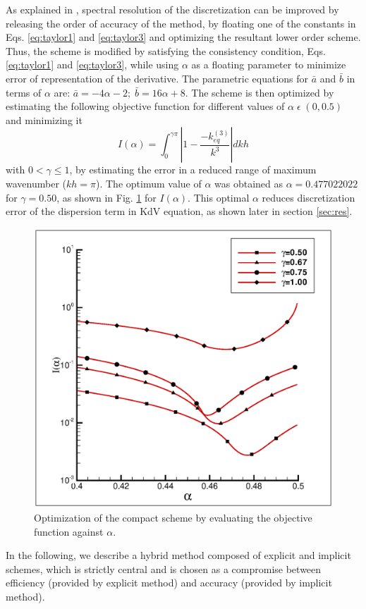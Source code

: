 \documentclass{svjour3}                    %
\begin{document}
 As explained in \cite{Sengupta2013a,Sengupta2006b}, spectral resolution of the discretization
can be improved by releasing the order of accuracy of the method, by floating one of the constants in Eqs.  \eqref{eq:taylor1} and \eqref{eq:taylor3}
and optimizing the resultant lower order scheme. Thus, the scheme is modified by satisfying the consistency condition, Eqs. \eqref{eq:taylor1} and 
\eqref{eq:taylor3}, while using $\alpha$ as a floating parameter to minimize error of representation of the derivative. The parametric equations for 
$\bar{a}$ and $\bar{b}$ in terms of $\alpha$ are: $ \bar{a}= -4\alpha-2;\; \bar{b}=16\alpha +8$. The scheme is then optimized by estimating the following objective function for different values of $\alpha\; \epsilon\; (0,0.5)$ and minimizing it
\begin{equation}
\label{obj}
I(\alpha) = \int_0^{\gamma\pi} \left| 1 - \frac{-k_{eq}^{(3)}}{k^3} \right| dkh
\end{equation}
with $0<\gamma\leq 1$, by estimating the error in a reduced range of maximum wavenumber ($kh = \pi$). The optimum value of $\alpha$ was obtained as 
$\alpha=0.477022022$ for $\gamma = 0.50$, as shown in Fig. \ref{fig:optim} for $I(\alpha)$. This optimal $\alpha$ reduces discretization error of the dispersion term in KdV equation, as shown later in section \ref{sec:res}. 

\begin{figure}[h!]
\center
\includegraphics[width=0.5\linewidth]{Fig_5}
\caption{Optimization of the compact scheme by evaluating the objective function against $\alpha$.}
\label{fig:optim}
\end{figure}

In the following, we describe a hybrid method composed of explicit and implicit schemes, which is strictly central and is chosen as a compromise between efficiency (provided by explicit method) and accuracy (provided by implicit
method). 
\end{document}
